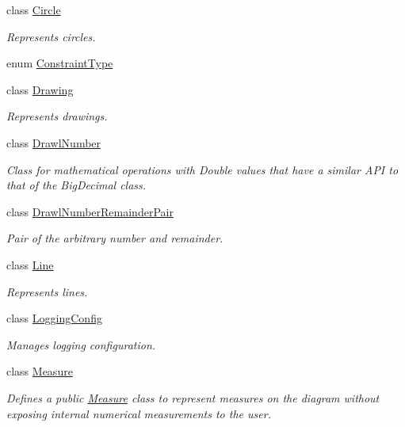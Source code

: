 \begin{DoxyCompactItemize}
\item 
class \hyperlink{classcom_1_1aarrelaakso_1_1drawl_1_1_circle}{Circle}
\begin{DoxyCompactList}\small\item\em Represents circles. \end{DoxyCompactList}\item 
enum \hyperlink{enumcom_1_1aarrelaakso_1_1drawl_1_1_constraint_type}{Constraint\+Type}
\item 
class \hyperlink{classcom_1_1aarrelaakso_1_1drawl_1_1_drawing}{Drawing}
\begin{DoxyCompactList}\small\item\em Represents drawings. \end{DoxyCompactList}\item 
class \hyperlink{classcom_1_1aarrelaakso_1_1drawl_1_1_drawl_number}{Drawl\+Number}
\begin{DoxyCompactList}\small\item\em Class for mathematical operations with Double values that have a similar A\+PI to that of the Big\+Decimal class. \end{DoxyCompactList}\item 
class \hyperlink{classcom_1_1aarrelaakso_1_1drawl_1_1_drawl_number_remainder_pair}{Drawl\+Number\+Remainder\+Pair}
\begin{DoxyCompactList}\small\item\em Pair of the arbitrary number and remainder. \end{DoxyCompactList}\item 
class \hyperlink{classcom_1_1aarrelaakso_1_1drawl_1_1_line}{Line}
\begin{DoxyCompactList}\small\item\em Represents lines. \end{DoxyCompactList}\item 
class \hyperlink{classcom_1_1aarrelaakso_1_1drawl_1_1_logging_config}{Logging\+Config}
\begin{DoxyCompactList}\small\item\em Manages logging configuration. \end{DoxyCompactList}\item 
class \hyperlink{classcom_1_1aarrelaakso_1_1drawl_1_1_measure}{Measure}
\begin{DoxyCompactList}\small\item\em Defines a public \hyperlink{classcom_1_1aarrelaakso_1_1drawl_1_1_measure}{Measure} class to represent measures on the diagram without exposing internal numerical measurements to the user. \end{DoxyCompactList}\item 

\end{DoxyCompactItemize}
